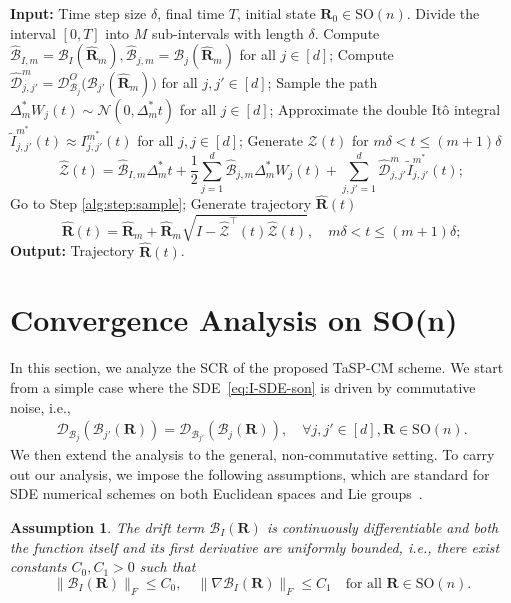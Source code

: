 \documentclass[11pt, a4paper, onecolumn]{article}
\newcommand{\SOn}{\mathrm{SO}(n)}
\newcommand{\m}{m}
\newcommand{\D}{\tg {D}}
\newcommand{\DO}{\tg D^{O}}
\newcommand{\bfR}{\mathbf{R}}
\newcommand{\Z}{\mathcal{Z}}
\newcommand{\B}{\mathcal{B}}
\newcommand{\hatB}{\widehat{\B}}
\newcommand{\hatZ}{\widehat{\Z}}
\newcommand{\hatR}{\widehat{\bfR}}
\newcommand{\hatD}{\widehat{\tg D}}
\newcommand{\tg}[1]{\mathcal{#1}}
\newcommand{\ms}{{m^*}}
\newcommand{\hBIms}{{\hatB_{I,\m}}}
\newcommand{\hBjms}{{\hatB_{j,\m}}}
\newcommand{\Dms}{{\Delta^{*}_{m}}}
\newcommand{\hDjjpms}{ {\hatD_{j,j'}^{\m}} }
\newcommand{\Ijjpms}{ {I_{j,j'}^{\ms}} }
\newcommand{\tIjjpms}{ { \tilde I_{j,j'}^{\ms}} }
\newcommand{\Der}[4]{
  #1_{#2}\bigl(#3(#4)\bigr)
}
\newcommand{\DerDOjjp}[1]{\Der{\DO}{\B_j}{\B_{j'}}{#1}}
\newtheorem{assumption}{Assumption}
\begin{document}
\begin{algorithm}[t]
    \caption{TaSP-CM Scheme on $\SOn$}
    \label{alg:tasp-ms}
    \begin{algorithmic}[1] 
        \State \textbf{Input:} Time step size $\delta$, final time $T$, initial state $\bfR_0 \in \SOn$.
        \State Divide the interval $[0, T]$ into $M$ sub-intervals with length $\delta$.
            \State Compute $\hBIms = \B_I(\hatR_{\m}), \hBjms = \B_j(\hatR_{\m})$ for all $j\in [d]$;
            \State Compute $\hDjjpms =\DerDOjjp{\hatR_m}$ for all $j,j'\in [d]$;
            \State Sample the path $\Dms W_j(t) \sim \mathcal{N}(0,\Dms t)$ for all $j\in [d]$; \label{alg:step:sample}
            \State Approximate the double It\^o integral $\tIjjpms(t) \approx \Ijjpms(t) $ for all $j,j\in [d]$;
            \State Generate $\Z(t)$ for $ m\delta < t \le (m+1)\delta$
               \[  \hatZ(t)=  \hBIms  \Dms t + \frac{1}{2} \sum_{j=1}^d \hBjms \Dms W_j(t) + \sum_{j,j'=1}^d \hDjjpms \tIjjpms(t);\]
            \If{$I - \hatZ^{\top}(t)\hatZ(t)$ is not positive definite}
                \State Go to Step \ref{alg:step:sample}; %
            \Else
                \State Generate trajectory $\hatR(t)$
                \[    \hatR(t) =\hatR_{\m} + \hatR_{\m} \sqrt{ I - \hatZ^{\top}(t)\hatZ(t)}, \quad m\delta < t \le (m+1)\delta;\]
            \EndIf
        \EndFor
        \State \textbf{Output:} Trajectory $\hatR(t)$. %
    \end{algorithmic}
\end{algorithm}


\section{Convergence Analysis on SO(n)} \label{sec:conv-so}
In this section, we analyze the SCR of the proposed TaSP-CM scheme. We start from a simple case where the SDE~\cref{eq:I-SDE-son} is driven by commutative noise, i.e., 
\begin{align*}
    \D_{\B_j}(\B_{j'}(\bfR)) = \D_{\B_{j'}}(\B_{j}(\bfR)), \quad \forall j,j'\in [d], \bfR\in \SOn.
\end{align*} 
We then extend the analysis to the general, non-commutative setting. To carry out our analysis, we impose the following assumptions, which are standard for SDE numerical schemes on both Euclidean spaces and Lie groups~\cite{mil1975approximate,misawa2001lie,wang2025tangent}.

\begin{assumption}\label{asm:drift}
The drift term $\B_{I}(\mathbf R)$ is continuously differentiable and both the function itself and its first derivative are uniformly bounded, i.e., there exist constants $C_{0}, C_{1}>0$ such that
\[
   \|\B_{I}(\mathbf R)\|_F\le C_0, \quad \|\nabla \B_{I}(\mathbf R)\|_F\le C_1 \quad\text{for all } \mathbf R\in\SOn.
\]
\end{assumption}
\end{document}
